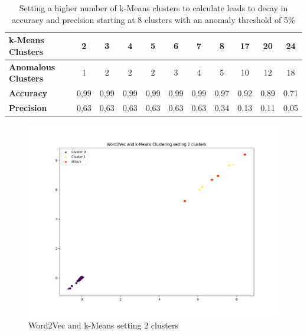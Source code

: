 \documentclass[
    fontsize=12pt,
    headings=small,
    parskip=half,           %
    bibliography=totoc,
    numbers=noenddot,       %
    open=any,               %
    ]{scrreprt}
\begin{document}
\begin{table}[H]
	\caption{Setting a higher number of k-Means clusters to calculate leads to decay in accuracy and precision starting at 8 clusters with an anomaly threshold of 5\%}
	\label{tab:k-means_clusters}
	\begin{tabular}{|l|c|c|c|c|c|c|c|c|c|c|}
	\hline
	\textbf{k-Means Clusters}   & \textbf{2} & \textbf{3} & \textbf{4} & \textbf{5} & \textbf{6} & \textbf{7} & \textbf{8} & \textbf{17} & \textbf{20} & \textbf{24} \\ \hline
	\textbf{Anomalous Clusters} & 1          & 2          & 2          & 2          & 3          & 4          & 5          & 10          & 12          & 18          \\ \hline
	\textbf{Accuracy}           & 0,99       & 0,99       & 0,99       & 0,99       & 0,99       & 0,99       & 0,97       & 0,92        & 0,89        & 0.71        \\ \hline
	\textbf{Precision}          & 0,63       & 0,63       & 0,63       & 0,63       & 0,63       & 0,63       & 0,34       & 0,13        & 0,11        & 0,05        \\ \hline
	\end{tabular}
\end{table}

\begin{figure}[H]
	\caption{Word2Vec and k-Means setting 2 clusters}
	\label{fig:kmeans_clusters_2}
	\sffamily\footnotesize
	\includegraphics[width=1\textwidth]{pic/k_means_2.png}
	\unitlength=0.75mm
	\linethickness{0.4pt}
\end{figure}
\end{document}
